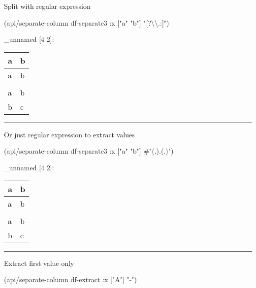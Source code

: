 \documentclass[]{article}
\newenvironment{Shaded}{\begin{snugshade}}{\end{snugshade}}
\newcommand{\StringTok}[1]{\textcolor[rgb]{0.31,0.60,0.02}{#1}}
\newcommand{\SpecialStringTok}[1]{\textcolor[rgb]{0.31,0.60,0.02}{#1}}
\newcommand{\AttributeTok}[1]{\textcolor[rgb]{0.77,0.63,0.00}{#1}}
\newcommand{\NormalTok}[1]{#1}
\begin{document}
Split with regular expression

\begin{Shaded}
\begin{Highlighting}[]
\NormalTok{(api/separate-column df-separate3 }\AttributeTok{:x}\NormalTok{ [}\StringTok{"a"} \StringTok{"b"}\NormalTok{] }\StringTok{"[?}\NormalTok{\textbackslash{}\textbackslash{}}\StringTok{.:]"}\NormalTok{)}
\end{Highlighting}
\end{Shaded}

\_unnamed {[}4 2{]}:

\begin{longtable}[]{@{}ll@{}}
\toprule
a & b\tabularnewline
\midrule
\endhead
a & b\tabularnewline
&\tabularnewline
a & b\tabularnewline
b & c\tabularnewline
\bottomrule
\end{longtable}

\begin{center}\rule{0.5\linewidth}{0.5pt}\end{center}

Or just regular expression to extract values

\begin{Shaded}
\begin{Highlighting}[]
\NormalTok{(api/separate-column df-separate3 }\AttributeTok{:x}\NormalTok{ [}\StringTok{"a"} \StringTok{"b"}\NormalTok{] }\SpecialStringTok{#"(.).(.)"}\NormalTok{)}
\end{Highlighting}
\end{Shaded}

\_unnamed {[}4 2{]}:

\begin{longtable}[]{@{}ll@{}}
\toprule
a & b\tabularnewline
\midrule
\endhead
a & b\tabularnewline
&\tabularnewline
a & b\tabularnewline
b & c\tabularnewline
\bottomrule
\end{longtable}

\begin{center}\rule{0.5\linewidth}{0.5pt}\end{center}

Extract first value only

\begin{Shaded}
\begin{Highlighting}[]
\NormalTok{(api/separate-column df-extract }\AttributeTok{:x}\NormalTok{ [}\StringTok{"A"}\NormalTok{] }\StringTok{"-"}\NormalTok{)}
\end{Highlighting}
\end{Shaded}
\end{document}
